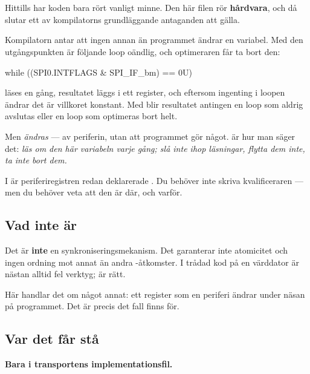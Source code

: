 \section{\texorpdfstring{}{volatile}}
\label{sec:volatile}

Hittills har koden bara rört vanligt minne. Den här filen rör \textbf{hårdvara}, och då slutar ett
av kompilatorns grundläggande antaganden att gälla.

Kompilatorn antar att ingen annan än programmet ändrar en variabel. Med den utgångspunkten är
följande loop oändlig, och optimeraren får ta bort den:

\begin{cppcode}
while ((SPI0.INTFLAGS & SPI_IF_bm) == 0U)
{
}
\end{cppcode}

 läses en gång, resultatet läggs i ett register, och eftersom ingenting i loopen
ändrar det är villkoret konstant. Med  blir resultatet antingen en loop som aldrig
avslutas eller en loop som optimeras bort helt.

Men  \emph{ändras} --- av periferin, utan att programmet gör något.
 är hur man säger det: \emph{läs om den här variabeln varje gång; slå inte ihop
läsningar, flytta dem inte, ta inte bort dem.}

I  är periferiregistren redan deklarerade . Du behöver inte skriva
kvalificeraren --- men du behöver veta att den är där, och varför.

\subsection{Vad \texorpdfstring{}{volatile} inte är}

Det är \textbf{inte} en synkroniseringsmekanism. Det garanterar inte atomicitet och ingen ordning
mot annat än andra -åtkomster. I trådad kod på en värddator är 
nästan alltid fel verktyg;  är rätt.

Här handlar det om något annat: ett register som en periferi ändrar under näsan på programmet. Det
är precis det fall  finns för.

\subsection{Var det får stå}

\textbf{Bara i transportens implementationsfil.}

